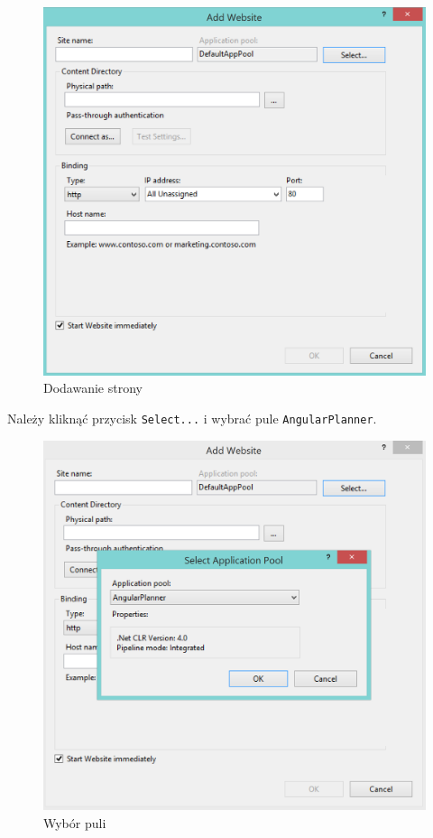 \documentclass[10pt,titlepage]{article}
\begin{document}
\begin{figure}[H]
  \centering
  \includegraphics[scale=0.35]{images/install8.png}
  \caption{Dodawanie strony}
\end{figure}
\par Należy kliknąć przycisk \verb|Select...| i wybrać pule \verb|AngularPlanner|.
\begin{figure}[H]
  \centering
  \includegraphics[scale=0.35]{images/install9.png}
  \caption{Wybór puli}
\end{figure}
\end{document}
